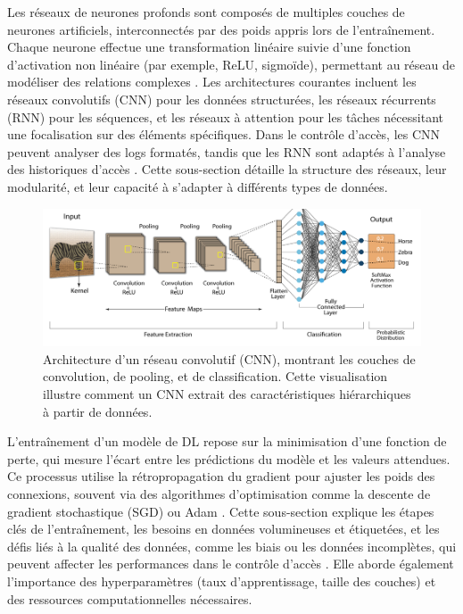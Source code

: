 Les réseaux de neurones profonds sont composés de multiples couches de neurones artificiels, interconnectés par des poids appris lors de l’entraînement. Chaque neurone effectue une transformation linéaire suivie d’une fonction d’activation non linéaire (par exemple, ReLU, sigmoïde), permettant au réseau de modéliser des relations complexes \cite{lecun2015deep}. Les architectures courantes incluent les réseaux convolutifs (CNN) pour les données structurées, les réseaux récurrents (RNN) pour les séquences, et les réseaux à attention pour les tâches nécessitant une focalisation sur des éléments spécifiques. Dans le contrôle d’accès, les CNN peuvent analyser des logs formatés, tandis que les RNN sont adaptés à l’analyse des historiques d’accès \cite{karpathy2015visualizing}. Cette sous-section détaille la structure des réseaux, leur modularité, et leur capacité à s’adapter à différents types de données.

\begin{figure}[h]
    \centering
    \includegraphics[width=1.0\textwidth]{My-Thesis/Chap1/images/cnn.png}
    \caption{Architecture d’un réseau convolutif (CNN), montrant les couches de convolution, de pooling, et de classification. Cette visualisation illustre comment un CNN extrait des caractéristiques hiérarchiques à partir de données.}
    \label{fig:cnn_architecture}
\end{figure}

L’entraînement d’un modèle de DL repose sur la minimisation d’une fonction de perte, qui mesure l’écart entre les prédictions du modèle et les valeurs attendues. Ce processus utilise la rétropropagation du gradient pour ajuster les poids des connexions, souvent via des algorithmes d’optimisation comme la descente de gradient stochastique (SGD) ou Adam \cite{lecun2015deep}. Cette sous-section explique les étapes clés de l’entraînement, les besoins en données volumineuses et étiquetées, et les défis liés à la qualité des données, comme les biais ou les données incomplètes, qui peuvent affecter les performances dans le contrôle d’accès \cite{slack2020fooling}. Elle aborde également l’importance des hyperparamètres (taux d’apprentissage, taille des couches) et des ressources computationnelles nécessaires.

